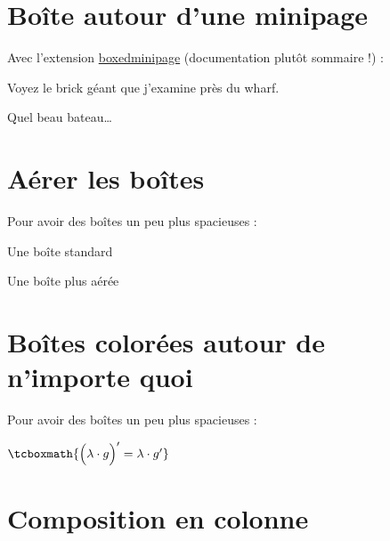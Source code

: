 




\section{Boîte autour d'une minipage}
Avec l'extension \href{http://mirror.ctan.org/macros/latex/contrib/boxedminipage/boxedminipage.pdf}{boxedminipage} (documentation plutôt sommaire !) :
\begin{LTXexample}[pos=o,width=.5]
\begin{boxedminipage}[t]{3cm}
    Voyez le brick géant que j'examine près du wharf.
\end{boxedminipage}
\begin{boxedminipage}[t]{3cm}
    Quel beau bateau\dots
\end{boxedminipage}
\end{LTXexample}





\section{Aérer les boîtes}
Pour avoir des boîtes un peu plus spacieuses :
\begin{LTXexample}[pos=o,width=.4]
	\parbox{3cm}{Une boîte standard}
\end{LTXexample}
\begin{LTXexample}[pos=o,width=.4]
	\setlength{\fboxsep}{10pt}
	\parbox{3cm}{Une boîte plus aérée}
\end{LTXexample}





\section{Boîtes colorées autour de n'importe quoi}
Pour avoir des boîtes un peu plus spacieuses :
\begin{LTXexample}[pos=o,width=.25]
$\tcboxmath{\Big( \lambda \cdot g \Big)' = \lambda \cdot g'}$
\end{LTXexample}





\section{Composition en colonne}



